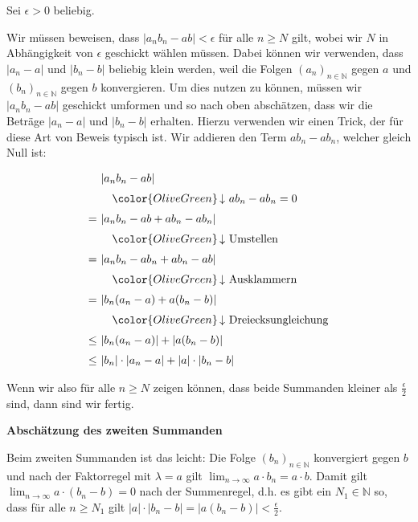 \documentclass[fontsize=9pt,
               parskip=half-,
               DIV=14,
               listof=chapterentry,
               tocflat]{scrbook}
\begin{document}
\begin{proof*}
Sei $\epsilon >0$ beliebig.

Wir müssen beweisen, dass $|a_{n}b_{n}-ab|<\epsilon $ für alle $n\geq N$ gilt, wobei wir $N$ in Abhängigkeit von $\epsilon $ geschickt wählen müssen. Dabei können wir verwenden, dass $|a_{n}-a|$ und $|b_{n}-b|$ beliebig klein werden, weil die Folgen $(a_{n})_{n\in \mathbb {N} }$ gegen $a$ und $(b_{n})_{n\in \mathbb {N} }$ gegen $b$ konvergieren. Um dies nutzen zu können, müssen wir $|a_{n}b_{n}-ab|$ geschickt umformen und so nach oben abschätzen, dass wir die Beträge $|a_{n}-a|$ und $|b_{n}-b|$ erhalten. Hierzu verwenden wir einen Trick, der für diese Art von Beweis typisch ist. Wir addieren den Term $ab_{n}-ab_{n}$, welcher gleich Null ist:

\begin{align*}
&|a_{n}b_{n}-ab|\\[0.3em]&\quad {\color {OliveGreen}\left\downarrow \ ab_{n}-ab_{n}=0\right.}\\[0.3em]=\ &|a_{n}b_{n}-ab+ab_{n}-ab_{n}|\\[0.3em]&\quad {\color {OliveGreen}\left\downarrow \ {\text{Umstellen}}\right.}\\[0.3em]=\ &|a_{n}b_{n}-ab_{n}+ab_{n}-ab|\\[0.3em]&\quad {\color {OliveGreen}\left\downarrow \ {\text{Ausklammern}}\right.}\\[0.3em]=\ &|b_{n}(a_{n}-a)+a(b_{n}-b)|\\[0.3em]&\quad {\color {OliveGreen}\left\downarrow \ {\text{Dreiecksungleichung}}\right.}\\[0.3em]\leq \ &|b_{n}(a_{n}-a)|+|a(b_{n}-b)|\\[0.3em]\leq \ &|b_{n}|\cdot |a_{n}-a|+|a|\cdot |b_{n}-b|
\end{align*}

Wenn wir also für alle $n\geq N$ zeigen können, dass beide Summanden kleiner als ${\tfrac {\epsilon }{2}}$ sind, dann sind wir fertig.

\textbf{Abschätzung des zweiten Summanden}

Beim zweiten Summanden ist das leicht: Die Folge $(b_{n})_{n\in \mathbb {N} }$ konvergiert gegen $b$ und nach der Faktorregel mit $\lambda =a$ gilt $\lim _{n\to \infty }a\cdot b_{n}=a\cdot b$. Damit gilt $\lim _{n\to \infty }a\cdot (b_{n}-b)=0$ nach der Summenregel, d.h. es gibt ein $N_{1}\in \mathbb {N} $ so, dass für alle $n\geq N_{1}$ gilt $|a|\cdot |b_{n}-b|=|a(b_{n}-b)|<{\tfrac {\epsilon }{2}}$.


\end{proof*}
\end{document}
